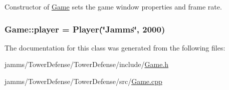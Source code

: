 Constructor of \hyperlink{class_game}{Game} sets the game window properties and frame rate. 

\hypertarget{class_game_a6e48721b0532833b99fd5615a3628792}{
\subsubsection[{player}]{ Game\+::player = {\bf Player}(\char`\"{}Jamms\char`\"{}, 2000)\hspace{0.3cm}{\ttfamily [static]}}}\label{class_game_a6e48721b0532833b99fd5615a3628792}


The documentation for this class was generated from the following files\+:\begin{DoxyCompactItemize}
\item 
jamms/\+Tower\+Defense/\+Tower\+Defense/include/\hyperlink{_game_8h}{Game.\+h}\item 
jamms/\+Tower\+Defense/\+Tower\+Defense/src/\hyperlink{_game_8cpp}{Game.\+cpp}\end{DoxyCompactItemize}
